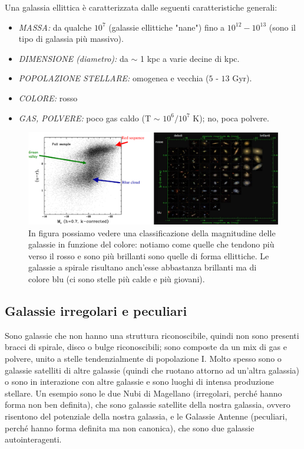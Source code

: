 Una galassia ellittica è caratterizzata dalle seguenti caratteristiche generali:
\begin{itemize}
	\item \emph{MASSA:} da qualche $10^7$ \unit{\solarmass{}} (galassie ellittiche "nane") fino a $10^{12} - 10^{13}$ \unit{\solarmass{}} (sono il tipo di galassia più massivo).
	\item \emph{DIMENSIONE (diametro):} da $\sim$ 1 kpc a varie decine di kpc.
	\item \emph{POPOLAZIONE STELLARE:} omogenea e vecchia ($5$ - $13$ Gyr).
	\item \emph{COLORE:} rosso
	\item \emph{GAS, POLVERE:} poco gas caldo (T $\sim$ $10^6/10^7$ K); no, poca polvere.
\end{itemize}

\begin{figure}
	\centering
	\includegraphics[width = \textwidth]{immagini/galassie-colore-magnitudine.png}
	\caption{In figura possiamo vedere una classificazione della magnitudine delle galassie in funzione del colore: notiamo come quelle che tendono più verso il rosso e sono più brillanti sono quelle di forma ellittiche. Le galassie a spirale risultano anch'esse abbastanza brillanti ma di colore blu (ci sono stelle più calde e più giovani).}
	\label{fig:galassie-colore-magnitudine}
\end{figure}

\subsection{Galassie irregolari e peculiari}
Sono galassie che non hanno una struttura riconoscibile, quindi non sono presenti bracci di spirale, disco o bulge riconoscibili; sono composte da un mix di gas e polvere, unito a stelle tendenzialmente di popolazione I. Molto spesso sono o galassie satelliti di altre galassie (quindi che ruotano attorno ad un'altra galassia) o sono in interazione con altre galassie e sono luoghi di intensa produzione stellare. Un esempio sono le due Nubi di Magellano (irregolari, perché hanno forma non ben definita), che sono galassie satellite della nostra galassia, ovvero risentono del potenziale della nostra galassia, e le Galassie Antenne (peculiari, perché hanno forma definita ma non canonica), che sono due galassie autointeragenti.

